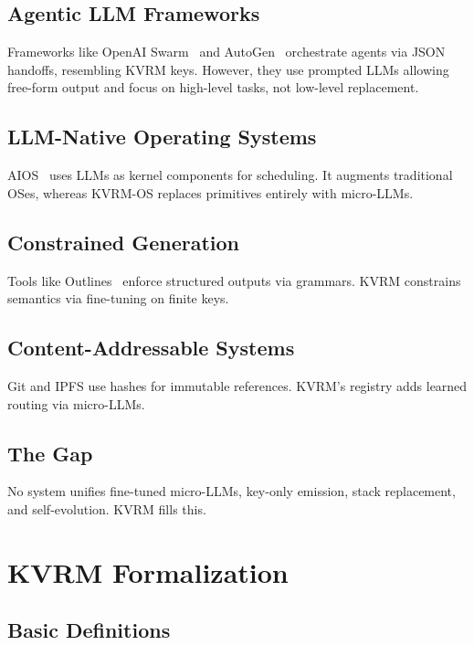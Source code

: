 \documentclass[11pt,a4paper]{article}
\begin{document}
\subsection{Agentic LLM Frameworks}

Frameworks like OpenAI Swarm~\cite{openai2024swarm} and AutoGen~\cite{wu2023autogen} orchestrate agents via JSON handoffs, resembling KVRM keys. However, they use prompted LLMs allowing free-form output and focus on high-level tasks, not low-level replacement.

\subsection{LLM-Native Operating Systems}

AIOS~\cite{mei2024aios} uses LLMs as kernel components for scheduling. It augments traditional OSes, whereas KVRM-OS replaces primitives entirely with micro-LLMs.

\subsection{Constrained Generation}

Tools like Outlines~\cite{willard2023efficient} enforce structured outputs via grammars. KVRM constrains semantics via fine-tuning on finite keys.

\subsection{Content-Addressable Systems}

Git and IPFS use hashes for immutable references. KVRM's registry adds learned routing via micro-LLMs.

\subsection{The Gap}

No system unifies fine-tuned micro-LLMs, key-only emission, stack replacement, and self-evolution. KVRM fills this.

\section{KVRM Formalization}
\label{sec:formalization}

\subsection{Basic Definitions}
\end{document}
